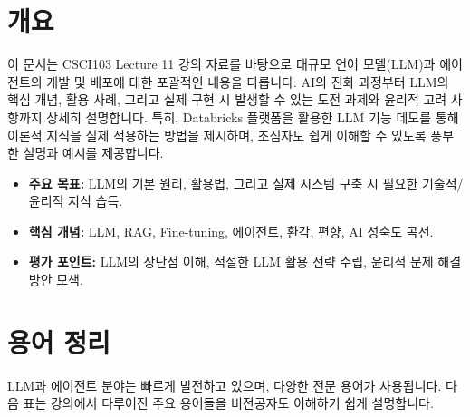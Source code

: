 \documentclass[11pt,a4paper]{article}
\begin{document}
\newpage
\section*{개요}
이 문서는 CSCI103 Lecture 11 강의 자료를 바탕으로 대규모 언어 모델(LLM)과 에이전트의 개발 및 배포에 대한 포괄적인 내용을 다룹니다. AI의 진화 과정부터 LLM의 핵심 개념, 활용 사례, 그리고 실제 구현 시 발생할 수 있는 도전 과제와 윤리적 고려 사항까지 상세히 설명합니다. 특히, Databricks 플랫폼을 활용한 LLM 기능 데모를 통해 이론적 지식을 실제 적용하는 방법을 제시하며, 초심자도 쉽게 이해할 수 있도록 풍부한 설명과 예시를 제공합니다.

\begin{itemize}
    \item \textbf{주요 목표:} LLM의 기본 원리, 활용법, 그리고 실제 시스템 구축 시 필요한 기술적/윤리적 지식 습득.
    \item \textbf{핵심 개념:} LLM, RAG, Fine-tuning, 에이전트, 환각, 편향, AI 성숙도 곡선.
    \item \textbf{평가 포인트:} LLM의 장단점 이해, 적절한 LLM 활용 전략 수립, 윤리적 문제 해결 방안 모색.
\end{itemize}

\newpage
\section{용어 정리}

LLM과 에이전트 분야는 빠르게 발전하고 있으며, 다양한 전문 용어가 사용됩니다. 다음 표는 강의에서 다루어진 주요 용어들을 비전공자도 이해하기 쉽게 설명합니다.
\end{document}

